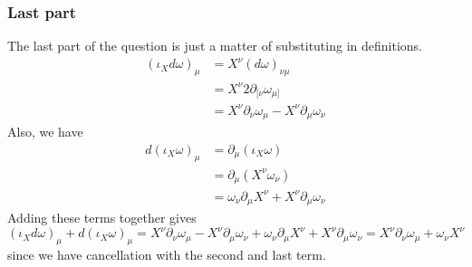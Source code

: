 \subsubsection*{Last part} 
The last part of the question is just a matter of 
substituting in definitions. 
\begin{align*}
	( \iota_X d \omega ) _ \mu &=  X^\nu ( d \omega) _{ \nu\mu } \\
				   &=  X ^ \nu 2 \partial  _{ [ \nu } \omega _{ \mu ] } \\
				   &=  X^\nu \partial  _\nu \omega_{ \mu } - X ^ \nu \partial  _{ \mu } \omega _{ \nu } 
\end{align*}
Also, we have 
\begin{align*}
	d ( \iota _{ X  } \omega) _{ \mu }  &=  \partial  _\mu ( \iota _ X \omega )  \\
					    & =  \partial _ \mu ( X^\nu \omega_\nu) \\
					    &=  \omega_ \nu \partial  _{ \mu } X ^ \nu + X ^ \nu \partial _ \mu \omega _ \nu 
\end{align*}
Adding these terms together gives 
\[
 ( \iota _ X d \omega ) _ \mu + d ( \iota _ X \omega )_\mu  = X^ \nu \partial  _ \nu \omega _ \mu - X ^ \nu \partial  _ \mu \omega _ \nu + \omega _ \nu \partial  _ \mu X ^ \nu + X ^ \nu \partial  _ \mu \omega _ \nu  = X^ \nu \partial  _ \nu  \omega _ \mu + \omega _ \nu X ^ \nu 
\] since we have cancellation with the second and last term. 



\pagebreak 

